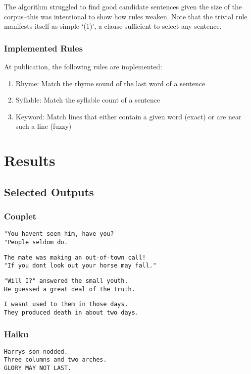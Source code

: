 \documentclass[10pt]{article}
\begin{document}
The algorithm struggled to find good candidate sentences given the size of the
corpus--this was intentional to show how rules weaken. Note that the trivial
rule manifests itself as simple `(1)', a clause sufficient to select any
sentence.

\subsubsection{Implemented Rules}
At publication, the following rules are implemented:
\onehalfspacing
\begin{enumerate}
\item Rhyme: Match the rhyme sound of the last word of a sentence
\item Syllable: Match the syllable count of a sentence
\item Keyword: Match lines that either contain a given word (exact) or are near such a line (fuzzy)
\end{enumerate}
\doublespacing

\section{Results}
\subsection{Selected Outputs}
\subsubsection{Couplet}
\begin{verbatim}
"You havent seen him, have you? 
"People seldom do.
\end{verbatim}

\begin{verbatim}
The mate was making an out-of-town call!
"If you dont look out your horse may fall."
\end{verbatim}

\begin{verbatim}
"Will I?" answered the small youth.
He guessed a great deal of the truth.
\end{verbatim}

\begin{verbatim}
I wasnt used to them in those days.
They produced death in about two days.
\end{verbatim}
\subsubsection{Haiku}
\begin{verbatim}
Harrys son nodded.
Three columns and two arches.
GLORY MAY NOT LAST.
\end{verbatim}
\end{document}

